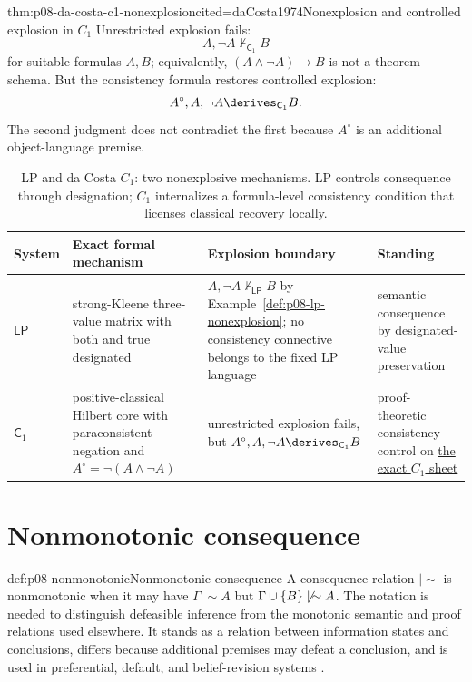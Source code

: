 \begin{hbtheorem}{thm:p08-da-costa-c1-nonexplosion}{cited=daCosta1974}{Nonexplosion and controlled explosion in \(C_1\)}
Unrestricted explosion fails:
\[
 A,\neg A\nvdash_{\mathsf C_1}B
\]
for suitable formulas \(A,B\); equivalently,
\((A\land\neg A)\to B\) is not a theorem schema.  But the consistency formula
restores controlled explosion:
\[
 A^\circ,A,\neg A\derives_{\mathsf C_1}B.
\]
The second judgment does not contradict the first because \(A^\circ\) is an
additional object-language premise.
\end{hbtheorem}

\begin{table}[htbp]
\centering\small
\begin{tabularx}{\textwidth}{@{}l X X X@{}}
\toprule
System & Exact formal mechanism & Explosion boundary & Standing \\
\midrule
\(\mathsf{LP}\) & strong-Kleene three-value matrix with both and true
designated & \(A,\neg A\nvdash_{\mathsf{LP}}B\) by
Example~\ref{def:p08-lp-nonexplosion}; no consistency connective belongs to
the fixed LP language & semantic consequence by designated-value preservation
\cite{Priest1979} \\
\(\mathsf C_1\) & positive-classical Hilbert core with paraconsistent
negation and \(A^\circ=\neg(A\land\neg A)\) & unrestricted explosion fails,
but \(A^\circ,A,\neg A\derives_{\mathsf C_1}B\) & proof-theoretic
consistency control on
\hyperref[sheet:hilbert-da-costa-c1]{the exact \(C_1\) sheet}
\cite{daCosta1974} \\
\bottomrule
\end{tabularx}
\caption{LP and da Costa \(C_1\): two nonexplosive mechanisms.  LP controls
consequence through designation; \(C_1\) internalizes a formula-level
consistency condition that licenses classical recovery locally.}
\label{tab:p08-paraconsistent-systems}
\end{table}

\section{Nonmonotonic consequence}

\begin{hbdefinition}{def:p08-nonmonotonic}{Nonmonotonic consequence}
A consequence relation \(\mathrel{|\!\sim}\) is nonmonotonic when it may have
\(\Gamma\mathrel{|\!\sim}A\) but
\(\Gamma\cup\{B\}\not\mathrel{|\!\sim}A\). The notation is needed to
distinguish defeasible inference from the monotonic semantic and proof
relations used elsewhere. It stands as a relation between information states
and conclusions, differs because additional premises may defeat a conclusion,
and is used in preferential, default, and belief-revision systems
\cite{KrausLehmannMagidor1990,Makinson2005}.
\end{hbdefinition}

